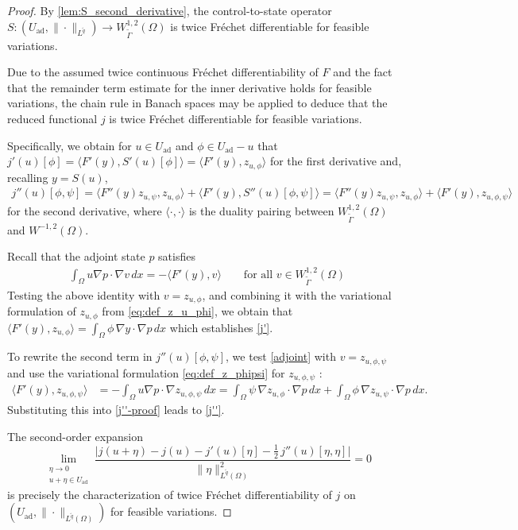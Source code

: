 \documentclass[11pt]{article}
\newcommand{\feas}{U_{\textrm{ad}}}
\theoremstyle{definition}
\theoremstyle{remark}
\begin{document}
\begin{proof}
By \cref{lem:S_second_derivative}, the control-to-state operator
$S:(\feas,\|\cdot\|_{L^{\tilde q}})\to W^{1,2}_{\tilde\Gamma}(\Omega)$
is twice Fréchet differentiable for feasible variations.

Due to the assumed twice continuous Fréchet differentiability of $F$ and the fact that
the remainder term estimate for the inner derivative holds for feasible variations,
the chain rule in Banach spaces may be applied to deduce that the reduced functional
$j$ is twice Fréchet differentiable for feasible variations.

Specifically, we obtain for $u \in \feas$ and $\phi \in \feas - u$ that
$ j'(u)[\phi] = \langle F'(y),S'(u)[\phi]\rangle = \langle F'(y),z_{u, \phi}\rangle
$
for the first derivative and, recalling $y = S(u)$,
\begin{align} \label{j''-proof}
    j''(u)[\phi,\psi]
= \langle F''(y)z_{u, \psi},z_{u, \phi}\rangle
+
\langle F'(y),S''(u)[\phi,\psi]\rangle = \langle F''(y)z_{u, \psi},z_{u, \phi}\rangle
+
\langle F'(y),z_{u,\phi,\psi}\rangle
\end{align}
for the second derivative, where $\langle \cdot,\cdot \rangle$ is the duality pairing
between $W^{1,2}_{\tilde\Gamma}(\Omega)$ and $W^{-1,2}(\Omega)$.

Recall that the adjoint state $p$ satisfies
\begin{align}\label{adjoint}
\int_\Omega u \nabla p \cdot \nabla v \, dx
=
- \langle F'(y), v \rangle
\qquad \text{for all } v \in W^{1,2}_{\tilde\Gamma}(\Omega)
\end{align}
Testing the above identity with $v = z_{u, \phi}$, and combining it with the variational formulation of $z_{u, \phi}$ from \eqref{eq:def_z_u_phi}, we obtain that
$
\langle F'(y), z_{u, \phi} \rangle
=
\int_\Omega \phi \, \nabla y \cdot \nabla p \, dx$
 which establishes \eqref{j'}.

To rewrite the second term in $j''(u)[\phi,\psi]$, we test \eqref{adjoint} with
$v=z_{u,\phi,\psi}$ and use the variational formulation \eqref{eq:def_z_phipsi} for $z_{u,\phi,\psi}$ :
\begin{align*}
\langle F'(y),z_{u,\phi,\psi}\rangle
&=
-\int_\Omega u\nabla p\cdot\nabla z_{u,\phi,\psi}\,dx
=
\int_\Omega \psi\,\nabla z_{u, \phi}\cdot\nabla p\,dx
+
\int_\Omega \phi\,\nabla z_{u, \psi}\cdot\nabla p\,dx.
\end{align*}
Substituting this into  \eqref{j''-proof} leads to \eqref{j''}.

The second-order expansion
\[ \lim_{\substack{\eta\to 0\\ u+\eta\in\feas}}
\frac{
\bigl|j(u+\eta)-j(u)-j'(u)[\eta]-\frac12\,j''(u)[\eta,\eta]\bigr|
}{
\|\eta\|_{L^{\tilde q}(\Omega)}^2
}
=0
\]
is precisely the characterization of twice Fr\'echet differentiability of $j$ on
$(\feas,\|\cdot\|_{L^{\tilde q}(\Omega)})$ for feasible variations.


\end{proof}
\end{document}
